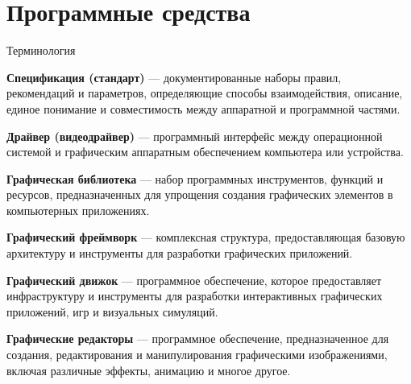 \documentclass{beamer}
\begin{document}
\section{Программные средства}
\begin{frame}{Терминология}
	{\scriptsize
	
	\textbf{Спецификация (стандарт)} --- документированные наборы правил, рекомендаций и параметров, определяющие способы взаимодействия, описание, единое понимание и совместимость между аппаратной и программной частями.
	
	\textbf{Драйвер (видеодрайвер)} --- программный интерфейс между операционной системой и графическим аппаратным обеспечением компьютера или устройства. 
	
	\textbf{Графическая библиотека} --- набор программных инструментов, функций и ресурсов, предназначенных для упрощения создания графических элементов в компьютерных приложениях. 
	
	\textbf{Графический фреймворк} --- комплексная структура, предоставляющая базовую архитектуру и инструменты для разработки графических приложений. 
	
	\textbf{Графический движок} --- программное обеспечение, которое предоставляет инфраструктуру и инструменты для разработки интерактивных графических приложений, игр и визуальных симуляций. 
	
	\textbf{Графические редакторы} --- программное обеспечение, предназначенное для создания, редактирования и манипулирования графическими изображениями, включая различные эффекты, анимацию и многое другое. 
	
}
\end{frame}
\end{document}
